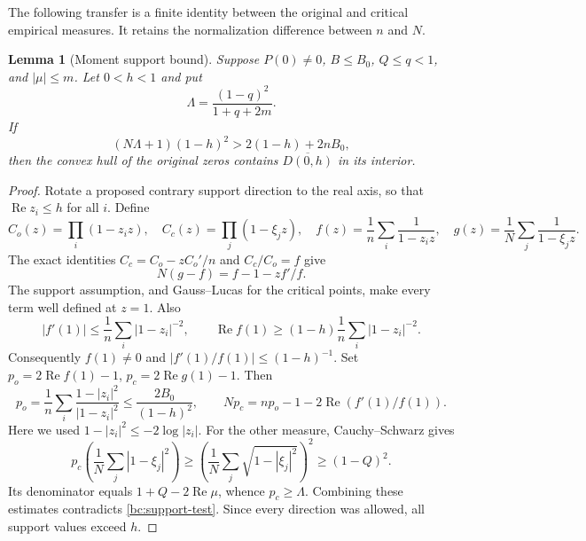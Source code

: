 \documentclass[11pt,reqno]{amsart}
\numberwithin{equation}{section}
\newtheorem{lemma}[theorem]{Lemma}
\theoremstyle{definition}
\theoremstyle{remark}
\renewcommand{\Re}{\operatorname{Re}}
\begin{document}
The following transfer is a finite identity between the original and
critical empirical measures.  It retains the normalization difference
between $n$ and $N$.

\begin{lemma}[Moment support bound]\label{bc:poisson-support}
Suppose $P(0)\ne0$, $B\leq B_0$, $Q\leq q<1$, and $|\mu|\leq m$.
Let $0<h<1$ and put
\[
 \Lambda=\frac{(1-q)^2}{1+q+2m}.
\]
If
\begin{equation}\label{bc:support-test}
 (N\Lambda+1)(1-h)^2>2(1-h)+2nB_0,
\end{equation}
then the convex hull of the original zeros contains $\overline{D(0,h)}$
in its interior.
\end{lemma}

\begin{proof}
Rotate a proposed contrary support direction to the real axis, so that
$\Re z_i\leq h$ for all $i$.  Define
\[
 C_o(z)=\prod_i(1-z_i z),\quad C_c(z)=\prod_j(1-\xi_jz),
 \quad f(z)=\frac1n\sum_i\frac1{1-z_i z},\quad
 g(z)=\frac1N\sum_j\frac1{1-\xi_jz}.
\]
The exact identities $C_c=C_o-zC_o'/n$ and $C_c/C_o=f$ give
\begin{equation}\label{bc:poisson-identity}
 N(g-f)=f-1-zf'/f.
\end{equation}
The support assumption, and Gauss--Lucas for the critical points,
make every term well defined at $z=1$.  Also
\[
 |f'(1)|\leq\frac1n\sum_i|1-z_i|^{-2},\qquad
 \Re f(1)\geq(1-h)\frac1n\sum_i|1-z_i|^{-2}.
\]
Consequently $f(1)\ne0$ and $|f'(1)/f(1)|\leq(1-h)^{-1}$.
Set $p_o=2\Re f(1)-1$, $p_c=2\Re g(1)-1$.  Then
\[
 p_o=\frac1n\sum_i\frac{1-|z_i|^2}{|1-z_i|^2}
 \leq\frac{2B_0}{(1-h)^2},\qquad
 Np_c=np_o-1-2\Re(f'(1)/f(1)).
\]
Here we used $1-|z_i|^2\leq-2\log|z_i|$.
For the other measure, Cauchy--Schwarz gives
\[
 p_c\left(\frac1N\sum_j|1-\xi_j|^2\right)
 \geq\left(\frac1N\sum_j\sqrt{1-|\xi_j|^2}\right)^2
 \geq(1-Q)^2.
\]
Its denominator equals $1+Q-2\Re\mu$, whence $p_c\geq\Lambda$.
Combining these estimates contradicts \eqref{bc:support-test}.
Since every direction was allowed, all support values exceed $h$.
\end{proof}
\end{document}
